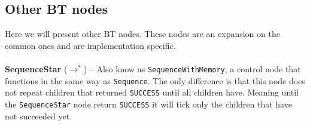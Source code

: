     \subsection{Other BT nodes}
        Here we will present other BT nodes. These nodes are an expansion on the common ones and are implementation specific.\\\\
        \textbf{SequenceStar} ($\to^{*}$) -- Also know as \texttt{SequenceWithMemory}, a control node that functions in the same way as \texttt{Sequence}. The only difference is that this node does not repeat children that returned \texttt{SUCCESS} until all children have. Meaning until the \texttt{SequenceStar} node return \texttt{SUCCESS} it will tick only the children that have not succeeded yet.